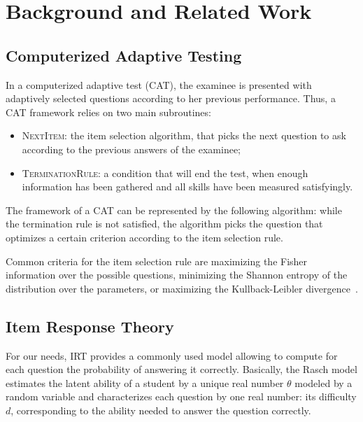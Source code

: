 \documentclass{edm_template}
\begin{document}
\section{Background and Related Work}

\subsection{Computerized Adaptive Testing}

In a computerized adaptive test (CAT), the examinee is presented with adaptively selected questions according to her previous performance. Thus, a CAT framework relies on two main subroutines:
\begin{itemize}
\item \textsc{NextItem}: the item selection algorithm, that picks the next question to ask according to the previous answers of the examinee;
\item \textsc{TerminationRule}: a condition that will end the test, when enough information has been gathered and all skills have been measured satisfyingly.
\end{itemize}

The framework of a CAT can be represented by the following algorithm: while the termination rule is not satisfied, the algorithm picks the question that optimizes a certain criterion according to the item selection rule.

Common criteria for the item selection rule are maximizing the Fisher information over the possible questions, minimizing the Shannon entropy of the distribution over the parameters, or maximizing the Kullback-Leibler divergence~\cite{Xu2003}. %

\subsection{Item Response Theory}

For our needs, IRT provides a commonly used model allowing to compute for each question the probability of answering it correctly. Basically, the Rasch model estimates the latent ability of a student by a unique real number $\theta$ modeled by a random variable and characterizes each question by one real number: its difficulty $d$, corresponding to the ability needed to answer the question correctly.
\end{document}
